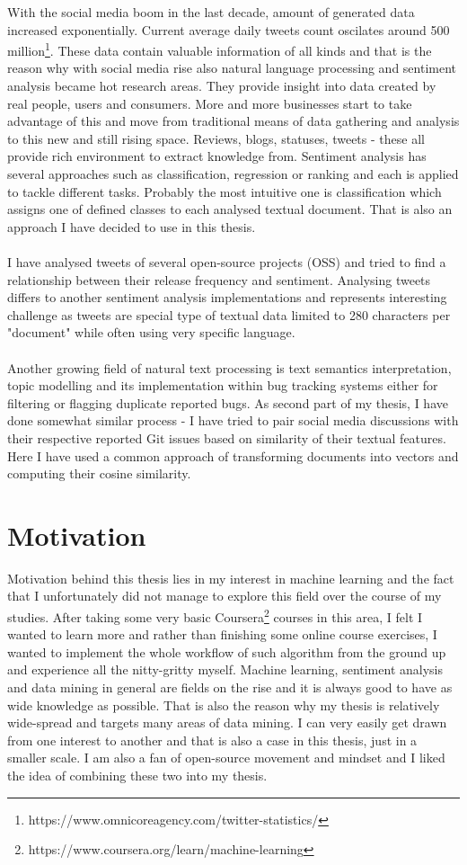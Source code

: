 With the social media boom in the last decade, amount of generated data increased exponentially. Current average daily tweets count oscilates around 500 million\footnote{https://www.omnicoreagency.com/twitter-statistics/}. These data contain valuable information of all kinds and that is the reason why with social media rise also natural language processing and sentiment analysis became hot research areas. They provide insight into data created by real people, users and consumers. More and more businesses start to take advantage of this and move from traditional means of data gathering and analysis to this new and still rising space. Reviews, blogs, statuses, tweets - these all provide rich environment to extract knowledge from.
Sentiment analysis has several approaches such as classification, regression or ranking and each is applied to tackle different tasks. Probably the most intuitive one is classification which assigns one of defined classes to each analysed textual document. That is also an approach I have decided to use in this thesis. \\
\\
I have analysed tweets of several open-source projects (OSS) and tried to find a relationship between their release frequency and sentiment. Analysing tweets differs to another sentiment analysis implementations and represents interesting challenge as tweets are special type of textual data limited to 280 characters per "document" while often using very specific language.\\
\\
Another growing field of natural text processing is text semantics interpretation, topic modelling and its implementation within bug tracking systems either for filtering or flagging duplicate reported bugs. As second part of my thesis, I have done somewhat similar process - I have tried to pair social media discussions with their respective reported Git issues based on similarity of their textual features. Here I have used a common approach of transforming documents into vectors and computing their cosine similarity.

\section{Motivation}
Motivation behind this thesis lies in my interest in machine learning and the fact that I unfortunately did not manage to explore this field over the course of my studies. After taking some very basic Coursera\footnote{https://www.coursera.org/learn/machine-learning} courses in this area, I felt I wanted to learn more and rather than finishing some online course exercises, I wanted to implement the whole workflow of such algorithm from the ground up and experience all the nitty-gritty myself. Machine learning, sentiment analysis and data mining in general are fields on the rise and it is always good to have as wide knowledge as possible. That is also the reason why my thesis is relatively wide-spread and targets many areas of data mining. I can very easily get drawn from one interest to another and that is also a case in this thesis, just in a smaller scale. I am also a fan of open-source movement and mindset and I liked the idea of combining these two into my thesis.